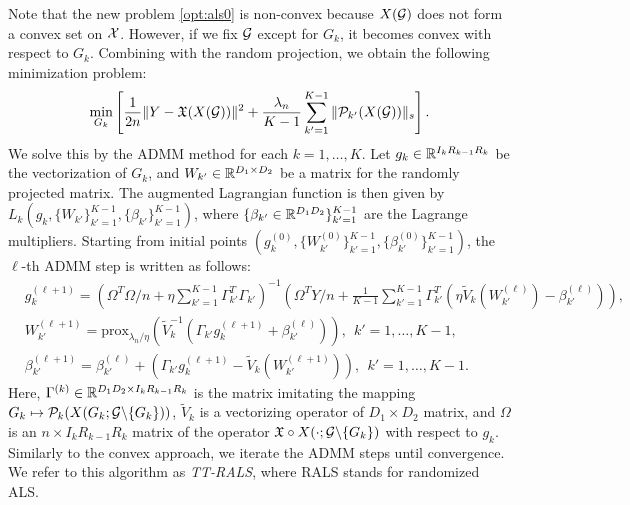 
Note that the new problem \eqref{opt:als0} is non-convex because
$X(\mathcal{G})$ does not form a convex set on $\mathcal{X}$.  However, if we fix
$\mathcal{G}$ except for $G_k$, it becomes convex with respect to
$G_k$. Combining with the random projection, we obtain the following
minimization problem:
\begin{align}
    \min_{G_k} \left[ \frac{1}{2n} \|Y - \mathfrak{X} (X(\mathcal{G}))\|^2 + \frac{\lambda_n}{K-1} \sum_{k'=1}^{K-1} \|\mathcal{P}_{k'}(X (\mathcal{G}))\|_{s} \right]. \label{opt:als2}
\end{align}
We solve this by the ADMM method for each $k = 1,\ldots,K$.  Let
$g_k \in \mathbb{R}^{I_kR_{k-1}R_k}$ be the vectorization of $G_k$, and
$W_{k'}\in \mathbb{R}^{D_1 \times D_2}$ be a matrix for the randomly projected matrix.
The augmented Lagrangian function is then given by
$L_k(g_k, \{W_{k'}\}_{k'=1}^{K-1}, \{\beta_{k'}\}_{k'=1}^{K-1})$,
where $\{\beta_{k'} \in \mathbb{R}^{D_1D_2} \}_{k'=1}^{K-1}$ are the Lagrange
multipliers.  Starting from initial points
$(g_k^{(0)}, \{W_{k'}^{(0)}\}_{k'=1}^{K-1},
\{\beta_{k'}^{(0)}\}_{k'=1}^{K-1})$,
the $\ell$-th ADMM step is written as follows:
\begin{align*}
    &g_k^{(\ell + 1)} = \left( \Omega^T \Omega / n + \eta \sum_{k'=1}^{K-1} \Gamma_{k'}^{T}\Gamma_{k'} \right)^{-1}  \left( \Omega^T Y / n + \frac{1}{K-1}\sum_{k'=1}^{K-1} \Gamma_{k'}^{T}( \eta \tilde{V}_k(W_{k'}^{(\ell)}) - \beta_{k'}^{(\ell)} )  \right) ,\\
    &W_{k'}^{(\ell + 1)} = \mbox{prox}_{\lambda_n / \eta} \left( \tilde{V}_k^{-1} ( \Gamma_{k'} g_k^{(\ell+1)} +\beta_{k'}^{(\ell)} ) \right),~~k'=1,\ldots,K-1, \\
    &  \beta_{k'}^{(\ell + 1)} = \beta_{k'}^{(\ell)} + (\Gamma_{k'} g_k^{(\ell + 1)} - \tilde{V}_k(W_{k'}^{(\ell + 1)})),~~k'=1,\ldots,K-1.
\end{align*}
Here, $\Gamma^{(k)} \in \mathbb{R}^{D_1 D_2 \times I_kR_{k-1}R_k}$ is the matrix
imitating the mapping
$G_k\mapsto\mathcal{P}_k(X(G_k;\mathcal{G} \backslash \{G_k\}))$, $\tilde{V}_k$ is a vectorizing operator of $D_1 \times D_2$
matrix, and $\Omega $ is an $n \times I_kR_{k-1}R_k$
matrix of the operator
$\mathfrak{X} \circ X( \cdot ; \mathcal{G} \backslash \{G_k\})$ with respect
to $g_k$.
%
Similarly to the convex approach, we iterate the ADMM steps until
convergence. We refer to this algorithm as \emph{TT-RALS}, where RALS stands for randomized ALS.

